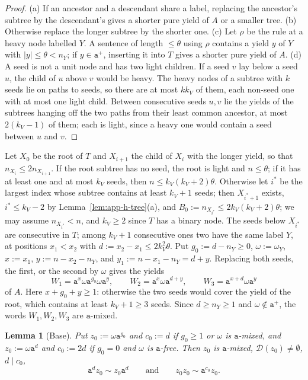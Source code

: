 \documentclass[11pt]{article}
\numberwithin{equation}{section}
\theoremstyle{plain}
\newtheorem{lemma}[theorem]{Lemma}
\theoremstyle{definition}
\theoremstyle{remark}
\theoremstyle{plain}
\newcommand{\D}{\mathcal{D}}
\begin{document}
\begin{proof}
(a) If an ancestor and a descendant share a label, replacing the ancestor's
subtree by the descendant's gives a shorter pure yield of $A$ or a smaller
tree.  (b) Otherwise replace the longer subtree by the shorter one.  (c) Let
$\rho$ be the rule at a heavy node labelled $Y$.  A sentence of length
$\le\theta$ using $\rho$ contains a yield $y$ of $Y$ with $|y|\le\theta<n_Y$;
if $y\in\mathtt a^+$, inserting it into $T$ gives a shorter pure yield of $A$.
(d) A seed is not a unit node and has two light children.  If a seed $v$ lay
below a seed $u$, the child of $u$ above $v$ would be heavy.  The heavy nodes of
a subtree with $k$ seeds lie on paths to seeds, so there are at most $kk_V$ of
them, each non-seed one with at most one light child.  Between consecutive
seeds $u,v$ lie the yields of the subtrees hanging off the two paths from
their least common ancestor, at most $2(k_V-1)$ of them; each is light, since a
heavy one would contain a seed between $u$ and $v$.
\end{proof}

Let $X_0$ be the root of $T$ and $X_{i+1}$ the child of $X_i$ with the longer
yield, so that $n_{X_i}\le2n_{X_{i+1}}$.  If the root subtree has no seed, the
root is light and $n\le\theta$; if it has at least one and at most $k_V$ seeds,
then $n\le k_V(k_V+2)\theta$.  Otherwise let $i^*$ be the largest index
whose subtree contains at least $k_V+1$ seeds; then $X_{i^*+1}$ exists,
$i^*\le k_V-2$ by Lemma~\ref{lem:app-h-tree}(a), and
$B_0:=n_{X_{i^*}}\le2k_V(k_V+2)\theta$; we may assume $n_{X_{i^*}}<n$, and
$k_V\ge2$ since $T$ has a binary node.  The seeds below $X_{i^*}$ are
consecutive in $T$; among $k_V+1$ consecutive ones two have the same label $Y$,
at positions $x_1<x_2$ with $d:=x_2-x_1\le2k_V^2\theta$.  Put $g_0:=d-n_Y\ge0$,
$\omega:=\omega_Y$, $x:=x_1$, $y:=n-x_2-n_Y$, and $y_1:=n-x_1-n_Y=d+y$.
Replacing both seeds, the first, or the second by $\omega$ gives the yields
\[
 W_1=\mathtt a^x\omega\mathtt a^{g_0}\omega\mathtt a^y,\qquad
 W_2=\mathtt a^x\omega\mathtt a^{d+y},\qquad
 W_3=\mathtt a^{x+d}\omega\mathtt a^y
\]
of $A$.  Here $x+g_0+y\ge1$: otherwise the two seeds would cover the yield of
the root, which contains at least $k_V+1\ge3$ seeds.  Since $d\ge n_Y\ge1$ and
$\omega\notin\mathtt a^+$, the words $W_1,W_2,W_3$ are $\mathtt a$-mixed.

\begin{lemma}[Base]
\label{lem:app-h-base}
Put $z_0:=\omega\mathtt a^{g_0}$ and $c_0:=d$ if $g_0\ge1$ or $\omega$ is
$\mathtt a$-mixed, and $z_0:=\omega\mathtt a^d$ and $c_0:=2d$ if $g_0=0$ and $\omega$
is $\mathtt a$-free.  Then $z_0$ is $\mathtt a$-mixed, $\D(z_0)\ne\emptyset$,
$d\mid c_0$,
\[
 \mathtt a^dz_0\sim z_0\mathtt a^d\qquad\text{and}\qquad z_0z_0\sim\mathtt a^{c_0}z_0.
\]
\end{lemma}
\end{document}
